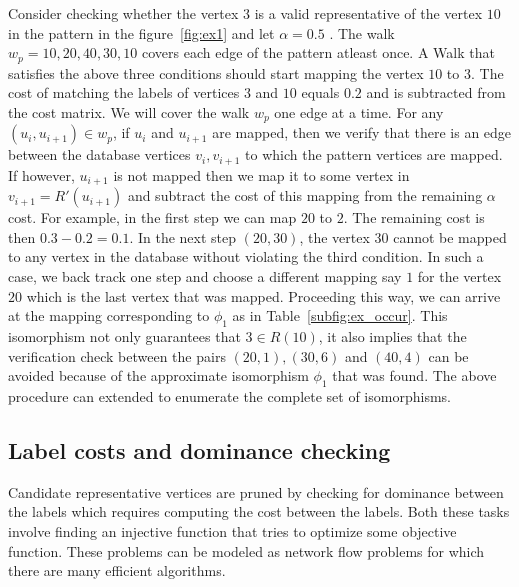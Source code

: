Consider checking whether the vertex $3$ is a valid representative of the 
vertex $10$ in the pattern in the figure~\ref{fig:ex1} and let 
$\alpha = 0.5$ . The walk $ w_p = 10, 20, 40, 30, 10$
covers each edge of the pattern atleast once. A Walk that satisfies the
above three conditions should start mapping the vertex $10$ to $3$. The cost of 
matching the labels of vertices $3$ and $10$ equals $0.2$ and is subtracted
from the cost matrix.
We will cover the walk $w_p$ one edge at a time. For any $(u_i, u_{i+1}) \in w_p$, 
if $u_i$ and $u_{i+1}$ are mapped, then we verify that there is 
an edge between the database vertices $v_i, v_{i+1}$ to which the pattern vertices are mapped.
If however, $u_{i+1}$ is not mapped then we map it to some vertex in $v_{i+1} = R'(u_{i+1})$
and subtract the cost of this mapping from the remaining $\alpha$ cost.
For example, in the first step we can map $20$ to $2$. The remaining
cost is then $0.3 - 0.2 = 0.1$. In the next step $(20,30)$, the vertex $30$
cannot be mapped to any vertex in the database without violating the third
condition.
In such a case, we back track one step and choose a different mapping say $1$
for the vertex $20$ which is the last vertex that was mapped. Proceeding this way, we can arrive
at the mapping corresponding to $\phi_{1}$ as in Table~\ref{subfig:ex_occur}.
This isomorphism not only guarantees that $3 \in R(10)$, it also implies
that the verification check between the pairs $(20, 1), (30, 6)$ and $(40, 4)$
can be avoided because of the approximate isomorphism $\phi_1$ that was found.
The above procedure can extended to enumerate the complete
set of isomorphisms.



\subsection{Label costs and dominance checking}
Candidate representative vertices are pruned by checking for dominance between
the \ncl labels which requires computing the cost between the \khop labels.
Both these tasks involve finding an injective function that tries to optimize
some objective function. These problems can be modeled as network flow problems
for which there are many efficient algorithms. 

